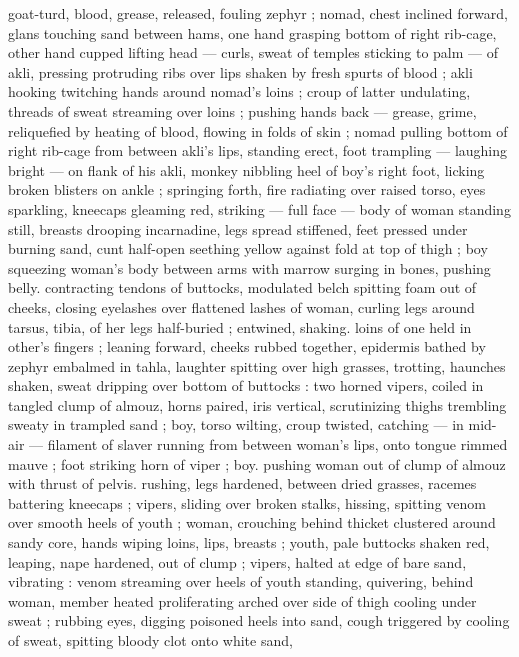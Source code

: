 {goat-turd, blood, grease, released, fouling zephyr ; nomad, chest 
inclined forward, glans touching sand between hams, one hand 
grasping bottom of right rib-cage, other hand cupped lifting head --- 
curls, sweat of temples sticking to palm --- of akli, pressing 
protruding ribs over lips shaken by fresh spurts of blood ; akli 
hooking twitching hands around nomad's loins ; croup of latter 
undulating, threads of sweat streaming over loins ; pushing hands 
back --- grease, grime, reliquefied by heating of blood, flowing in 
folds of skin ; nomad pulling bottom of right rib-cage from between 
akli's lips, standing erect, foot trampling --- laughing bright --- on 
flank of his akli, monkey nibbling heel of boy's right foot, licking 
broken blisters on ankle ; springing forth, fire radiating over raised 
torso, eyes sparkling, kneecaps gleaming red, striking --- full face 
--- body of woman standing still, breasts drooping incarnadine, legs 
spread stiffened, feet pressed under burning sand, cunt half-open 
seething yellow against fold at top of thigh ; boy squeezing woman's 
body between arms with marrow surging in bones, pushing belly. 
contracting tendons of buttocks, modulated belch spitting foam out 
of cheeks, closing eyelashes over flattened lashes of woman, curling 
legs around tarsus, tibia, of her legs half-buried ; entwined, shaking. 
loins of one held in other's fingers ; leaning forward, cheeks rubbed 
together, epidermis bathed by zephyr embalmed in tahla, laughter 
spitting over high grasses, trotting, haunches shaken, sweat dripping 
over bottom of buttocks : two horned vipers, coiled in tangled clump 
of almouz, horns paired, iris vertical, scrutinizing thighs trembling 
sweaty in trampled sand ; boy, torso wilting, croup twisted, catching 
--- in mid-air --- filament of slaver running from between woman's 
lips, onto tongue rimmed mauve ; foot striking horn of viper ; boy. 
pushing woman out of clump of almouz with thrust of pelvis. 
rushing, legs hardened, between dried grasses, racemes battering 
kneecaps ; vipers, sliding over broken stalks, hissing, spitting venom 
over smooth heels of youth ; woman, crouching behind thicket 
clustered around sandy core, hands wiping loins, lips, breasts ; 
youth, pale buttocks shaken red, leaping, nape hardened, out of 
clump ; vipers, halted at edge of bare sand, vibrating : venom 
streaming over heels of youth standing, quivering, behind woman, 
member heated proliferating arched over side of thigh cooling under 
sweat ; rubbing eyes, digging poisoned heels into sand, cough 
triggered by cooling of sweat, spitting bloody clot onto white sand, 
}
